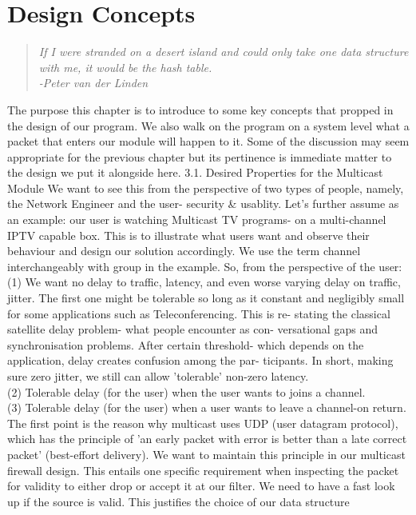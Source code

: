 \documentclass[11pt,left=2cm,bottom=2cm,oneside]{book}
\newcommand{\mquot}[1]{\begin{quotation}\textit{#1}\end{quotation}}
\begin{document}
\chapter{Design Concepts}
\mquot{If I were stranded on a desert island and could only take one data
structure with me, it would be the hash table.\\
-Peter van der Linden\\
}
The purpose this chapter is to introduce to some key concepts that propped in
the
design of our program. We also walk on the program on a system level what a
packet that enters our module will happen to it. Some of the discussion may
seem
appropriate for the previous chapter but its pertinence is immediate matter to
the
design we put it alongside here.
3.1. Desired Properties for the Multicast Module
We want to see this from the perspective of two types of people, namely, the
Network Engineer and the user- security \& usablity. Let's further assume as an
example: our user is watching Multicast TV programs- on a multi-channel IPTV
capable box. This is to illustrate what users want and observe their behaviour
and
design our solution accordingly. We use the term channel interchangeably with
group in the example. So, from the perspective of the user:
(1) We want no delay to traffic, latency, and even worse varying delay on
traffic, jitter. The first one might be tolerable so long as it constant and
negligibly small for some applications such as Teleconferencing. This is re-
stating the classical satellite delay problem- what people encounter as con-
versational gaps and synchronisation problems. After certain threshold-
which depends on the application, delay creates confusion among the par-
ticipants. In short, making sure zero jitter, we still can allow 'tolerable'
non-zero latency.\\
(2) Tolerable delay (for the user) when the user wants to joins a channel.\\
(3) Tolerable delay (for the user) when a user wants to leave a channel-on return.
The first point is the reason why multicast uses UDP (user datagram protocol),
which has the principle of 'an early packet with error is better than a late
correct
packet' (best-effort delivery). We want to maintain this principle in our
multicast
firewall design. This entails one specific requirement when inspecting the
packet
for validity to either drop or accept it at our filter. We need to have a fast
look
up if the source is valid. This justifies the choice of our data structure
\end{document}
